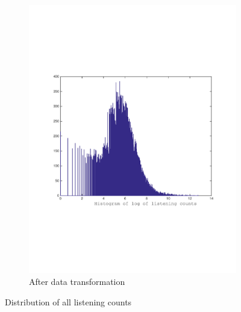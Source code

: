 \begin{figure}[h]
  \begin{subfigure}[b]{0.45\textwidth}
    \includegraphics[width=\textwidth]{figures/histLogYtrain_crop.pdf}
    \caption{After data transformation}
  \end{subfigure}
  \caption{Distribution of all listening counts}
  \label{fig:count_distribution}
\end{figure}

